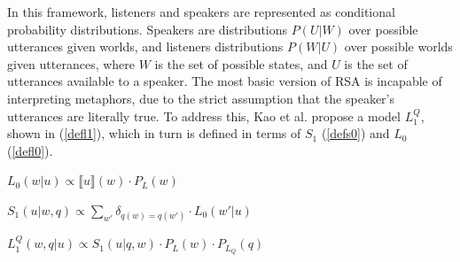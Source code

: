 \documentclass[9pt,twocolumn,twoside,lineno]{pnas-new}
\newcommand{\Listener}{L}
\newcommand{\QLONE}{\Listener_{{1}}^{{Q}}}
\begin{document}
	In this framework, listeners and speakers are represented as conditional probability distributions. Speakers are distributions $P(U\vert W)$ over possible utterances given worlds, and listeners distributions  $P(W\vert U)$ over possible worlds given utterances, where $W$ is the set of possible states, and $U$ is the set of utterances available to a speaker.
	The most basic version of RSA \cite{frank2012predicting} is incapable of interpreting metaphors, due to the strict assumption that the speaker's utterances are literally true. To address this, Kao et al. \cite{kao} propose a model $\QLONE$, shown in (\ref{defl1}), which in turn is defined in terms of $S_1$ (\ref{defs0}) and $L_0$ (\ref{defl0}).








	\begin{examples}
	\item $L_0(w\vert u) \propto \llbracket u \rrbracket (w)\cdot P_L(w)$ \label{defl0}
	\item $S_1(u\vert w,q) \propto \sum_{w'} \delta_{q(w)=q(w')} \cdot L_0(w'\vert u)$ \label{defs0}
	\item $\QLONE(w,q\vert u) \propto S_1(u\vert q,w)\cdot P_L(w)\cdot P_{L_Q}(q)$ \label{defl1}
	\end{examples}
\end{document}
